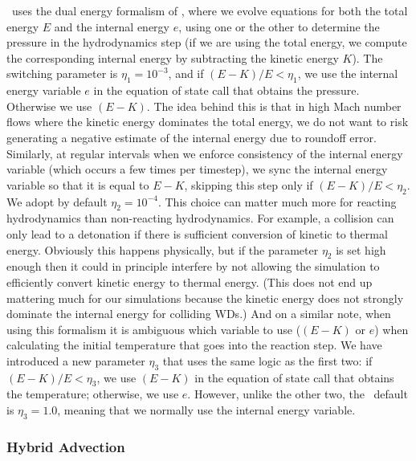 \documentclass[12pt]{article}
\begin{document}
\castro\ uses the dual energy formalism of \cite{bryan:1995,ENZO}, where we evolve equations
for both the total energy $E$ and the internal energy $e$, using one or the other to
determine the pressure in the hydrodynamics step (if we are using the total energy, we
compute the corresponding internal energy by subtracting the kinetic energy $K$). The switching
parameter is $\eta_1 = 10^{-3}$, and if $(E - K) / E < \eta_1$, we use the internal energy variable $e$
in the equation of state call that obtains the pressure. Otherwise we use $(E - K)$. The
idea behind this is that in high Mach number flows where the kinetic energy dominates the
total energy, we do not want to risk generating a negative estimate of the internal energy
due to roundoff error. Similarly, at regular intervals when we enforce consistency of the
internal energy variable (which occurs a few times per timestep), we sync the internal energy
variable so that it is equal to $E - K$, skipping this step only if $(E - K) / E < \eta_2$.
We adopt by default $\eta_2 = 10^{-4}$. This choice can matter much more for reacting
hydrodynamics than non-reacting hydrodynamics. For example, a collision can only lead to a
detonation if there is sufficient conversion of kinetic to thermal energy. Obviously
this happens physically, but if the parameter $\eta_2$ is set high enough then it could
in principle interfere by not allowing the simulation to efficiently convert kinetic energy
to thermal energy. (This does not end up mattering much for our simulations because the
kinetic energy does not strongly dominate the internal energy for colliding WDs.) And on
a similar note, when using this formalism it is ambiguous which variable to use ($(E - K)$
or $e$) when calculating the initial temperature that goes into the reaction step. We
have introduced a new parameter $\eta_3$ that uses the same logic as the first two: if
$(E - K) / E < \eta_3$, we use $(E - K)$ in the equation of state call that obtains the
temperature; otherwise, we use $e$. However, unlike the other two, the \castro\ default
is $\eta_3 = 1.0$, meaning that we normally use the internal energy variable.



\subsubsection{Hybrid Advection}
\label{sec:hybrid_advection}
\end{document}
